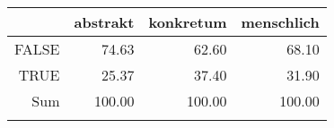 \begin{tabular}{rrrr}
  \lsptoprule
 & abstrakt & konkretum & menschlich \\ 
  \midrule
FALSE & 74.63 & 62.60 & 68.10 \\ 
  TRUE & 25.37 & 37.40 & 31.90 \\ 
  Sum & 100.00 & 100.00 & 100.00 \\ 
   \lspbottomrule
\end{tabular}
